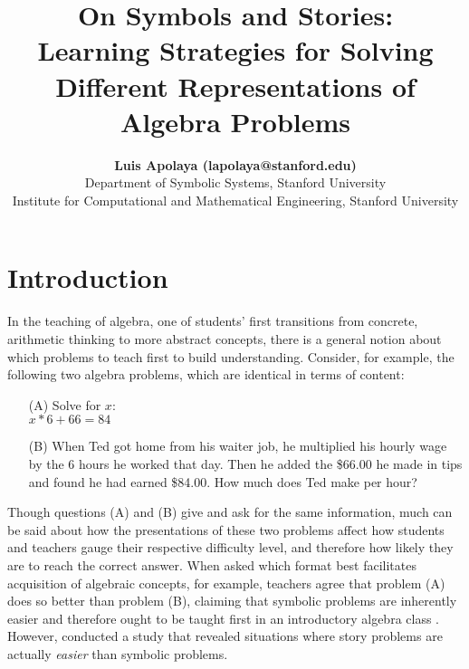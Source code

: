 \documentclass[10pt,letterpaper]{article}
\title{On Symbols and Stories:\\Learning Strategies for Solving Different Representations of Algebra Problems}
\author{{\large \bf Luis Apolaya (lapolaya@stanford.edu)} \\
	Department of Symbolic Systems, Stanford University
	\AND {\large \bf Amy Shoemaker (amyshoe@stanford.edu)} \\
	Institute for Computational and Mathematical Engineering, Stanford University}
\newcommand\TODO[1]{\textcolor{red}{#1}}
\begin{document}
	
	\maketitle
	
	
	
	
	\section{Introduction}
	
	
	In the teaching of algebra, one of students' first transitions from concrete, arithmetic thinking to more abstract concepts, there is a general notion about which problems to teach first to build understanding. Consider, for example, the following two algebra problems, which are identical in terms of content:
	
	\begin{enumerate}
		\item[(A)] Solve for $x$:\\ $x * 6 + 66 = 84$
		
		\item[(B)] When Ted got home from his waiter job, he multiplied his hourly wage by the 6 hours he worked that day. Then he added the \$66.00 he made in tips and found he had earned \$84.00. How much does Ted make per hour?
	\end{enumerate}
	
	Though questions (A) and (B) give and ask for the same information, much can be said about how the presentations of these two problems affect how students and teachers gauge their respective difficulty level, and therefore how likely they are to reach the correct answer. When asked which format best facilitates acquisition of algebraic concepts, for example, teachers agree that problem (A) does so better than problem (B), claiming that symbolic problems are inherently easier and therefore ought to be taught first in an introductory algebra class \cite{KoedNath2000}. However,  conducted a study that revealed situations where story problems are actually \textit{easier} than symbolic problems. 
	
\end{document}
